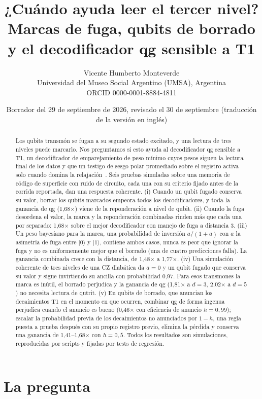 \documentclass[11pt]{article}
\title{¿Cuándo ayuda leer el tercer nivel?\\
Marcas de fuga, qubits de borrado y el decodificador qg sensible a T1}
\author{Vicente Humberto Monteverde\\
\small Universidad del Museo Social Argentino (UMSA), Argentina\\
\small ORCID 0000-0001-8884-4811}
\date{\small Borrador del 29 de septiembre de 2026, revisado el 30 de septiembre (traducción de la versión en inglés)}
\begin{document}
\maketitle

\begin{abstract}
Los qubits transmón se fugan a su segundo estado excitado, y una lectura de tres niveles puede
marcarlo. Nos preguntamos si esto ayuda al decodificador qg sensible a T1, un decodificador de
emparejamiento de peso mínimo cuyos pesos siguen la lectura final de los datos y que un testigo de
sesgo polar promediado sobre el registro activa solo cuando domina la
relajación~\cite{monteverde2026qang,monteverde2026witness}. Seis pruebas simuladas sobre una memoria
de código de superficie con ruido de circuito, cada una con su criterio fijado antes de la corrida
reportada, dan una respuesta coherente. (i) Cuando un qubit fugado conserva su valor, borrar los qubits
marcados empeora todos los decodificadores, y toda la ganancia de qg (1{,}68$\times$) viene de la
reponderación a nivel de qubit. (ii) Cuando la fuga desordena el valor, la marca y la reponderación
combinadas rinden más que cada una por separado: 1{,}68$\times$ sobre el mejor decodificador con
manejo de fuga a distancia 3. (iii) Un peso bayesiano para la marca, una probabilidad de inversión
$a/(1+a)$ con $a$ la asimetría de fuga entre $|0\rangle$ y $|1\rangle$, contiene ambos casos, nunca es
peor que ignorar la fuga y no es uniformemente mejor que el borrado (una de cuatro predicciones
falla). La ganancia combinada crece con la distancia, de 1{,}48$\times$ a 1{,}77$\times$. (iv) Una
simulación coherente de tres niveles de una CZ diabática da $a=0$ y un qubit fugado que conserva su
valor y sigue invirtiendo su ancilla con probabilidad 0{,}97. Para esos transmones la marca es inútil,
el borrado perjudica y la ganancia de qg (1{,}81$\times$ a $d=3$, 2{,}02$\times$ a $d=5$) no necesita
lectura de qutrit. (v) En qubits de borrado, que anuncian los decaimientos T1 en el momento en que
ocurren, combinar qg de forma ingenua perjudica cuando el anuncio es bueno (0{,}46$\times$ con
eficiencia de anuncio $h=0{,}99$); escalar la probabilidad previa de los decaimientos no anunciados
por $1-h$, una regla puesta a prueba después con su propio registro previo, elimina la pérdida y
conserva una ganancia de 1{,}41--1{,}68$\times$ con $h=0{,}5$. Todos los resultados son simulaciones, reproducidas por scripts y fijadas por
tests de regresión.
\end{abstract}

\section{La pregunta}
\end{document}
